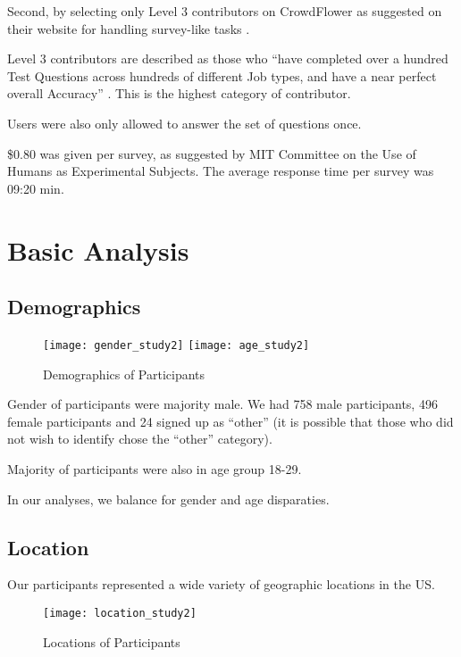 Second, by selecting only Level 3 contributors on CrowdFlower as suggested on their website for handling survey-like tasks \cite{CrowdFlower-guide}.

Level 3 contributors are described as those who ``have completed over a hundred Test Questions across hundreds of different Job types, and have a near perfect overall Accuracy'' \cite{CrowdFlower-levels}. This is the highest category of contributor.
 
Users were also only allowed to answer the set of questions once. 

\$0.80 was given per survey, as suggested by MIT Committee on the Use of Humans as Experimental Subjects. The average response time per survey was 09:20 min.


\section{Basic Analysis}

\subsection{Demographics}

\begin{figure}[H] 
\centering 
  \texttt{[image: gender\_study2]} 
  \texttt{[image: age\_study2]} 
  \caption{Demographics of Participants
    \label{fig:demographics2}}
\end{figure}

Gender of participants were majority male. We had 758 male participants, 496 female participants and 24 signed up as ``other'' (it is possible that those who did not wish to identify chose the ``other'' category). 

Majority of participants were also in age group 18-29.
 
In our analyses, we balance for gender and age disparaties. %

\subsection{Location}

Our participants represented a wide variety of geographic locations in the US.

\begin{figure}[H]  
\centering  
  \texttt{[image: location\_study2]} 
  \caption{Locations of Participants
    \label{fig:locations2}}
\end{figure}

